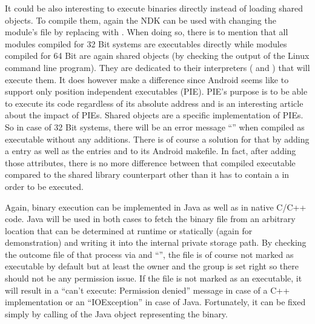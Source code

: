 It could be also interesting to execute binaries directly instead of loading shared objects. To compile them, again the NDK can be used with changing the module's
 file by replacing  with
. When doing so, there is to mention
that all modules compiled for 32 Bit systems are executables directly while modules
compiled for 64 Bit are again shared objects (by checking the output of the Linux
 command line program).
They are dedicated to their interpreters ( and ) that will execute them. It does however make a difference since
Android seems like to support only position independent executables (PIE).
PIE's purpose is to be able to execute its code regardless of its absolute address
and \parencite{pie} is an interesting article about the impact of PIEs.
Shared objects are a specific implementation of PIEs. So in case of 32 Bit systems, there will be an error message
``'' when
compiled as executable without any additions. There is of course a solution for that
by adding a  entry  as well as the 
entries  and  to its Android makefile. In fact, after adding
those attributes, there is no more difference between that compiled executable
compared to the shared library counterpart other than it has to contain a
 in order to be executed.

Again, binary execution can be implemented in Java as well as in native C/C++ code.
Java will be used in both cases to fetch the binary file from an arbitrary location that can be determined at runtime or statically (again 
for demonstration) and writing it into the internal private storage path. By checking the outcome file of that process via  and ``'', the file is of course not marked as executable by default but at least the owner and the group is set right so there
should not be any permission issue.
If the file is not marked as an executable, it will result in a ``can't execute: Permission denied'' message in case of a C++ implementation or an ``IOException'' in case of Java. Fortunately, it can be fixed simply by calling 
of the Java  object representing the binary.

